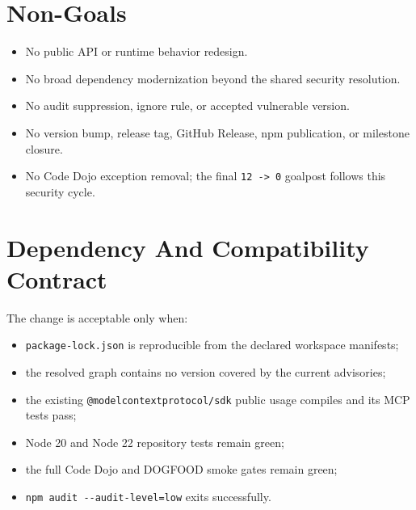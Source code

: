 \section{Non-Goals}\label{record-248-non-goals}

\begin{itemize}
\tightlist
\item
  No public API or runtime behavior redesign.
\item
  No broad dependency modernization beyond the shared security resolution.
\item
  No audit suppression, ignore rule, or accepted vulnerable version.
\item
  No version bump, release tag, GitHub Release, npm publication, or milestone closure.
\item
  No Code Dojo exception removal; the final \texttt{1\allowbreak{}2\allowbreak{} \allowbreak{}-\allowbreak{}>\allowbreak{} \allowbreak{}0} goalpost follows this security cycle.
\end{itemize}

\section{Dependency And Compatibility Contract}\label{record-248-dependency-and-compatibility-contract}

The change is acceptable only when:

\begin{itemize}
\tightlist
\item
  \texttt{p\allowbreak{}a\allowbreak{}c\allowbreak{}k\allowbreak{}a\allowbreak{}g\allowbreak{}e\allowbreak{}-\allowbreak{}l\allowbreak{}o\allowbreak{}c\allowbreak{}k\allowbreak{}.\allowbreak{}j\allowbreak{}s\allowbreak{}o\allowbreak{}n} is reproducible from the declared workspace manifests;
\item
  the resolved graph contains no version covered by the current advisories;
\item
  the existing \texttt{@\allowbreak{}m\allowbreak{}o\allowbreak{}d\allowbreak{}e\allowbreak{}l\allowbreak{}c\allowbreak{}o\allowbreak{}n\allowbreak{}t\allowbreak{}e\allowbreak{}x\allowbreak{}t\allowbreak{}p\allowbreak{}r\allowbreak{}o\allowbreak{}t\allowbreak{}o\allowbreak{}c\allowbreak{}o\allowbreak{}l\allowbreak{}/\allowbreak{}s\allowbreak{}d\allowbreak{}k} public usage compiles and its MCP tests pass;
\item
  Node 20 and Node 22 repository tests remain green;
\item
  the full Code Dojo and DOGFOOD smoke gates remain green;
\item
  \texttt{n\allowbreak{}p\allowbreak{}m\allowbreak{} \allowbreak{}a\allowbreak{}u\allowbreak{}d\allowbreak{}i\allowbreak{}t\allowbreak{} \allowbreak{}-\allowbreak{}-\allowbreak{}a\allowbreak{}u\allowbreak{}d\allowbreak{}i\allowbreak{}t\allowbreak{}-\allowbreak{}l\allowbreak{}e\allowbreak{}v\allowbreak{}e\allowbreak{}l\allowbreak{}=\allowbreak{}l\allowbreak{}o\allowbreak{}w} exits successfully.
\end{itemize}

